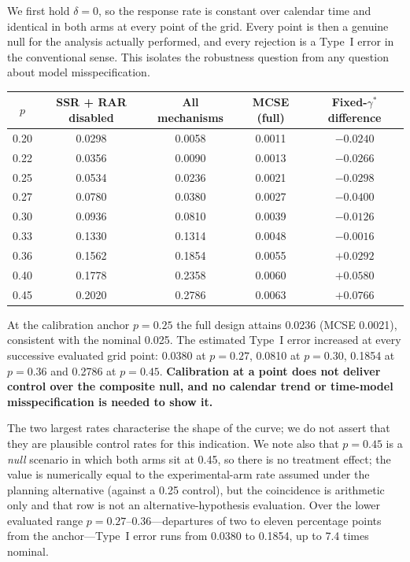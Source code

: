 \documentclass[11pt]{article}
\begin{document}
We first hold $\delta = 0$, so the response rate is constant over calendar time
and identical in both arms at every point of the grid.  Every point is then a
genuine null for the analysis actually performed, and every rejection is a
Type~I error in the conventional sense.  This isolates the robustness question
from any question about model misspecification.

\begin{center}
\begin{tabular}{ccccc}
\toprule
$p$ & SSR + RAR disabled & All mechanisms & MCSE (full) & Fixed-$\gamma^*$ difference \\
\midrule
0.20 & 0.0298 & 0.0058 & 0.0011 & $-0.0240$ \\
0.22 & 0.0356 & 0.0090 & 0.0013 & $-0.0266$ \\
0.25 & 0.0534 & 0.0236 & 0.0021 & $-0.0298$ \\
0.27 & 0.0780 & 0.0380 & 0.0027 & $-0.0400$ \\
0.30 & 0.0936 & 0.0810 & 0.0039 & $-0.0126$ \\
0.33 & 0.1330 & 0.1314 & 0.0048 & $-0.0016$ \\
0.36 & 0.1562 & 0.1854 & 0.0055 & $+0.0292$ \\
0.40 & 0.1778 & 0.2358 & 0.0060 & $+0.0580$ \\
0.45 & 0.2020 & 0.2786 & 0.0063 & $+0.0766$ \\
\bottomrule
\end{tabular}
\end{center}

\smallskip
At the calibration anchor $p=0.25$ the full design attains 0.0236
(MCSE 0.0021), consistent with the nominal 0.025.  The estimated Type~I error
increased at every successive evaluated grid point: 0.0380 at $p=0.27$, 0.0810 at $p=0.30$, 0.1854 at
$p=0.36$ and 0.2786 at $p=0.45$.  \textbf{Calibration at a point does not
deliver control over the composite null, and no calendar trend or
time-model misspecification is needed to show it.}

The two largest rates characterise the shape of the curve; we do not assert
that they are plausible control rates for this indication.  We note also that
$p=0.45$ is a \emph{null} scenario in which
both arms sit at 0.45, so there is no treatment effect; the value is
numerically equal to the experimental-arm rate assumed under the planning
alternative (against a 0.25 control), but the coincidence is arithmetic only
and that row is not an alternative-hypothesis evaluation.
Over the lower evaluated range $p=0.27$--$0.36$---departures of two to eleven
percentage points from the anchor---Type~I error runs from 0.0380 to 0.1854,
up to 7.4 times nominal.
\end{document}
